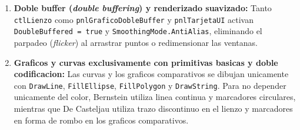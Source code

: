 \begin{enumerate}
    \item \textbf{Doble buffer (\textit{double buffering}) y renderizado suavizado:} Tanto \texttt{ctlLienzo} como \texttt{pnlGraficoDobleBuffer} y \texttt{pnlTarjetaUI} activan \texttt{DoubleBuffered = true} y \texttt{SmoothingMode.AntiAlias}, eliminando el parpadeo (\textit{flicker}) al arrastrar puntos o redimensionar las ventanas.

    \item \textbf{Graficos y curvas exclusivamente con primitivas basicas y doble codificacion:} Las curvas y los graficos comparativos se dibujan unicamente con \texttt{DrawLine}, \texttt{FillEllipse}, \texttt{FillPolygon} y \texttt{DrawString}. Para no depender unicamente del color, Bernstein utiliza linea continua y marcadores circulares, mientras que De Casteljau utiliza trazo discontinuo en el lienzo y marcadores en forma de rombo en los graficos comparativos.
\end{enumerate}

